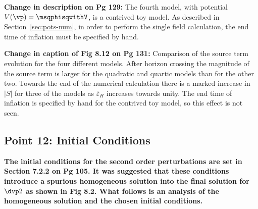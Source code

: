 \textbf{Change in description on Pg 129:}
The fourth model, with potential $V(\vp)=\msqphisqwithV$, is a contrived toy model.
As described in Section~\ref{sec:pots-num}, in order to perform the single field
calculation, the end time of inflation must be specified by hand. 

\textbf{Change in caption of Fig 8.12 on Pg 131:}
Comparison of the
source term
evolution for the four different models. After horizon crossing the magnitude of the
source term is larger for the quadratic and quartic models than for the other two.
Towards the end of the numerical calculation there is a marked increase in $|S|$ for
three of the models as $\bar{\varepsilon}_H$ increases towards unity. The end time of
inflation is specified by hand for the contrived toy model, so this effect is
not seen.

\subsection{Point 12: Initial Conditions}
\textbf{The initial conditions for the second order perturbations are set in Section 7.2.2 on Pg
105. It was suggested that these conditions introduce a spurious homogeneous solution into the
final solution for $\dvp2$ as shown in Fig 8.2. What follows is an analysis of the homogeneous
solution and the chosen initial conditions.}

